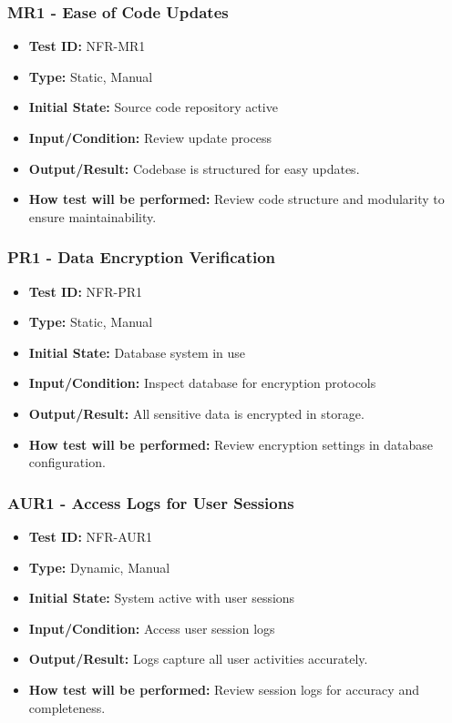 \documentclass[12pt, titlepage]{article}
\begin{document}
\subsubsection{MR1 - Ease of Code Updates}
\begin{itemize}
    \item \textbf{Test ID:} NFR-MR1
    \item \textbf{Type:} Static, Manual
    \item \textbf{Initial State:} Source code repository active
    \item \textbf{Input/Condition:} Review update process
    \item \textbf{Output/Result:} Codebase is structured for easy updates.
    \item \textbf{How test will be performed:} Review code structure and modularity to ensure maintainability.
\end{itemize}

\subsubsection{PR1 - Data Encryption Verification}
\begin{itemize}
    \item \textbf{Test ID:} NFR-PR1
    \item \textbf{Type:} Static, Manual
    \item \textbf{Initial State:} Database system in use
    \item \textbf{Input/Condition:} Inspect database for encryption protocols
    \item \textbf{Output/Result:} All sensitive data is encrypted in storage.
    \item \textbf{How test will be performed:} Review encryption settings in database configuration.
\end{itemize}

\subsubsection{AUR1 - Access Logs for User Sessions}
\begin{itemize}
    \item \textbf{Test ID:} NFR-AUR1
    \item \textbf{Type:} Dynamic, Manual
    \item \textbf{Initial State:} System active with user sessions
    \item \textbf{Input/Condition:} Access user session logs
    \item \textbf{Output/Result:} Logs capture all user activities accurately.
    \item \textbf{How test will be performed:} Review session logs for accuracy and completeness.
\end{itemize}
\end{document}
